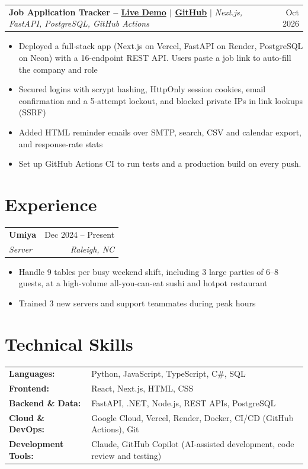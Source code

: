 \documentclass[letterpaper,11pt]{article}
\makeatletter
\newcommand{\entry}[4]{%
  \begin{tabularx}{\textwidth}{@{}X r@{}}
    \textbf{#1} & #2 \\
    \textit{#3} & \textit{#4} \\
  \end{tabularx}\vspace{-2pt}}
\newcommand{\project}[3]{%
  \begin{tabularx}{\textwidth}{@{}X r@{}}
    \textbf{#1} $|$ \textit{#2} & #3 \\
  \end{tabularx}\vspace{-2pt}}
\makeatother
\begin{document}
\project{Job Application Tracker -- \href{https://job-application-tracker-tau-orcin.vercel.app}{Live Demo} $|$ \href{https://github.com/Mtrinh123/JobApplicationTracker}{GitHub}}{Next.js, FastAPI, PostgreSQL, GitHub Actions}{Oct 2026}
\begin{itemize}
  \item Deployed a full-stack app (Next.js on Vercel, FastAPI on Render, PostgreSQL on Neon) with a 16-endpoint REST API. Users paste a job link to auto-fill the company and role
  \item Secured logins with scrypt hashing, HttpOnly session cookies, email confirmation and a 5-attempt lockout, and blocked private IPs in link lookups (SSRF)
  \item Added HTML reminder emails over SMTP, search, CSV and calendar export, and response-rate stats
  \item Set up GitHub Actions CI to run tests and a production build on every push. 
\end{itemize}

\section{Experience}
\entry{Umiya}{Dec 2024 -- Present}
      {Server}{Raleigh, NC}
\begin{itemize}
  \item Handle 9 tables per busy weekend shift, including 3 large parties of 6--8 guests, at a high-volume all-you-can-eat sushi and hotpot restaurant
  \item Trained 3 new servers and support teammates during peak hours
\end{itemize}

\section{Technical Skills}
\begin{tabularx}{\textwidth}{@{}l X@{}}
  \textbf{Languages:}       & Python, JavaScript, TypeScript, C\#, SQL \\
  \textbf{Frontend:}        & React, Next.js, HTML, CSS \\
  \textbf{Backend \& Data:} & FastAPI, .NET, Node.js, REST APIs, PostgreSQL \\
  \textbf{Cloud \& DevOps:} & Google Cloud, Vercel, Render, Docker, CI/CD (GitHub Actions), Git \\
  \textbf{Development Tools:} & Claude, GitHub Copilot (AI-assisted development, code review and testing) \\
\end{tabularx}
\end{document}
